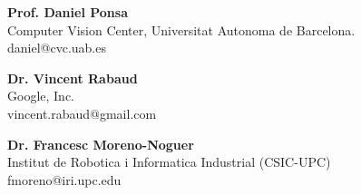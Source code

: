 \textbf{Prof. Daniel Ponsa}\\
Computer Vision Center, Universitat Autonoma de Barcelona.\\
daniel@cvc.uab.es

\textbf{Dr. Vincent Rabaud}\\
Google, Inc.\\
vincent.rabaud@gmail.com

\textbf{Dr. Francesc Moreno-Noguer}\\
Institut de Robotica i Informatica Industrial (CSIC-UPC)   
\\
fmoreno@iri.upc.edu
